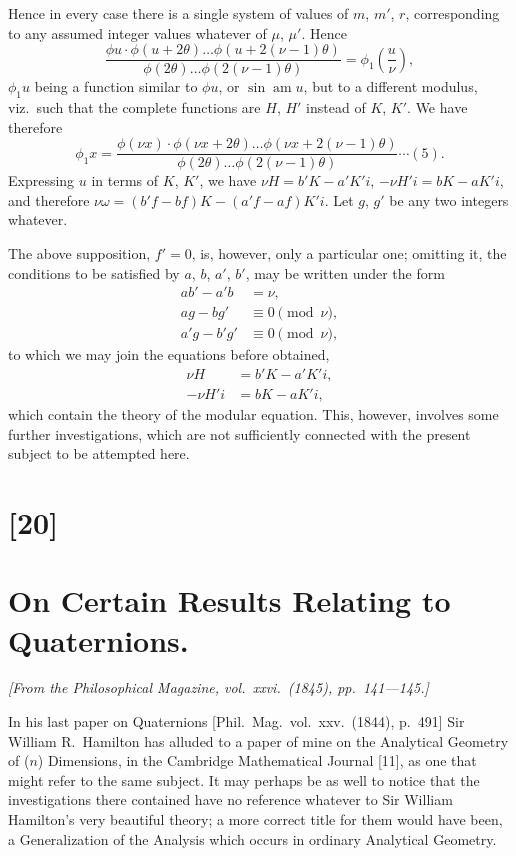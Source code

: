 \documentclass[11pt,a4paper]{book}
\begin{document}
Hence in every case there is a single system of values of $m$, $m'$, $r$, corresponding to
any assumed integer values whatever of $\mu$, $\mu'$. Hence
\[
\frac{\phi u \cdot \phi(u + 2\theta) \ldots \phi(u + 2(\nu-1)\theta)}{\phi(2\theta) \ldots \phi(2(\nu-1)\theta)} = \phi_1\left(\frac{u}{\nu}\right),
\]
$\phi_1 u$ being a function similar to $\phi u$, or $\sin \operatorname{am} u$, but to a different modulus, viz.\ such
that the complete functions are $H$, $H'$ instead of $K$, $K'$. We have therefore
\[
\phi_1 x = \frac{\phi(\nu x) \cdot \phi(\nu x + 2\theta) \ldots \phi(\nu x + 2(\nu-1)\theta)}{\phi(2\theta) \ldots \phi(2(\nu-1)\theta)} \cdots (5).
\]
Expressing $u$ in terms of $K$, $K'$, we have $\nu H = b'K - a'K'i$, $-\nu H'i = bK - aK'i$, and
therefore $\nu\omega = (b'f - bf)K - (a'f - af)K'i$. Let $g$, $g'$ be any two integers whatever.

\newpage
\setcounter{page}{122}

The above supposition, $f' = 0$, is, however, only a particular one; omitting it, the
conditions to be satisfied by $a$, $b$, $a'$, $b'$, may be written under the form
\begin{align*}
ab' - a'b &= \nu,\\
ag - bg' &\equiv 0 \pmod{\nu},\\
a'g - b'g' &\equiv 0 \pmod{\nu},
\end{align*}
to which we may join the equations before obtained,
\begin{align*}
\nu H &= b'K - a'K'i,\\
-\nu H'i &= bK - aK'i,
\end{align*}
which contain the theory of the modular equation. This, however, involves some
further investigations, which are not sufficiently connected with the present subject to
be attempted here.

\newpage
\section*{[20]}
\section*{On Certain Results Relating to Quaternions.}

\textit{[From the Philosophical Magazine, vol.~xxvi.~(1845), pp.~141---145.]}

\bigskip
\setcounter{page}{123}

In his last paper on Quaternions [Phil.\ Mag.\ vol.~xxv.~(1844), p.~491] Sir William
R.~Hamilton has alluded to a paper of mine on the Analytical Geometry of ($n$)
Dimensions, in the Cambridge Mathematical Journal [11], as one that might refer to the
same subject. It may perhaps be as well to notice that the investigations there contained
have no reference whatever to Sir William Hamilton's very beautiful theory; a more
correct title for them would have been, a Generalization of the Analysis which occurs
in ordinary Analytical Geometry.
\end{document}
